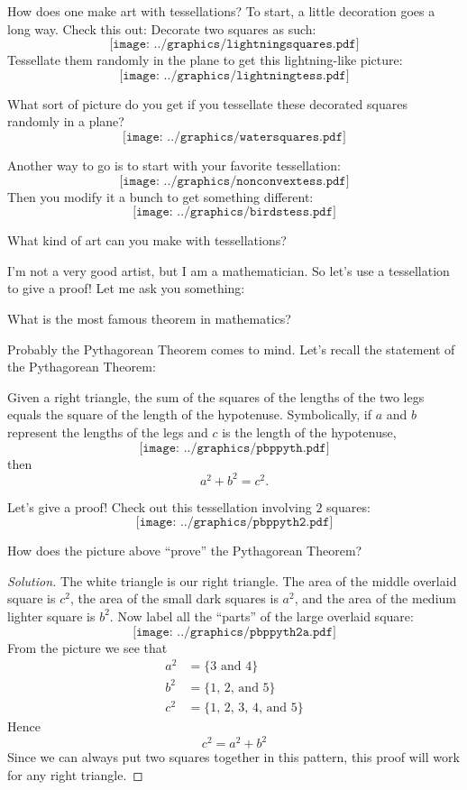 How does one make art with tessellations? To start, a little
decoration goes a long way. Check this out: Decorate two squares as
such:
\[
\texttt{[image: ../graphics/lightningsquares.pdf]}
\]
Tessellate them randomly in the plane to get this lightning-like picture:
\[
\texttt{[image: ../graphics/lightningtess.pdf]}
\]
\begin{question} 
What sort of picture do you get if you tessellate these decorated
squares randomly in a plane?
\[
\texttt{[image: ../graphics/watersquares.pdf]}
\]
\end{question}
\QM

Another way to go is to start with your favorite tessellation:
\[
\texttt{[image: ../graphics/nonconvextess.pdf]}
\]
Then you modify it a bunch to get something different:
\[
\texttt{[image: ../graphics/birdstess.pdf]}
\]

\begin{question} What kind of art can you make with tessellations?
\end{question}
\QM


I'm not a very good artist, but I am a mathematician. So let's use a
tessellation to give a proof! Let me ask you something:

\begin{question} What is the most famous theorem in mathematics? 
\end{question}
Probably the Pythagorean Theorem comes to mind. Let's recall the statement of the Pythagorean Theorem:

\begin{theorem} Given a right triangle, the sum of the squares of the 
lengths of the two legs equals the square of the length of 
the hypotenuse.  Symbolically, if $a$ and $b$ represent the 
lengths of the legs and $c$ is the length of the hypotenuse, 
\[
\texttt{[image: ../graphics/pbppyth.pdf]}
\]
then 
\[
a^2 + b^2 = c^2.
\]
\end{theorem}


Let's give a proof! Check out this tessellation involving $2$ squares:
\[
\texttt{[image: ../graphics/pbppyth2.pdf]}
\]
\begin{question} How does the picture above ``prove'' the Pythagorean Theorem?
\end{question}
\begin{proof}[Solution]  
The white triangle is our right triangle. The area of the middle
overlaid square is $c^2$, the area of the small dark squares is $a^2$,
and the area of the medium lighter square is $b^2$. Now label all the
``parts'' of the large overlaid square:
\[
\texttt{[image: ../graphics/pbppyth2a.pdf]}
\]
From the picture we see that
\begin{align*}
a^2 &= \{\text{3 and 4}\}\\
b^2 &= \{\text{1, 2, and 5}\}\\
c^2 &= \{\text{1, 2, 3, 4, and 5}\}
\end{align*}
Hence
\[
c^2 = a^2 + b^2
\]
Since we can always put two squares together in this pattern, this
proof will work for any right triangle.
\end{proof}

